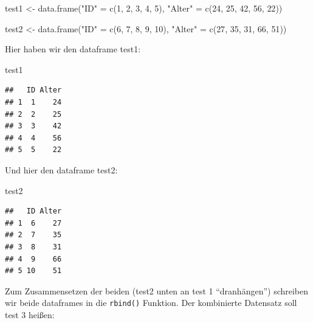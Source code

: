 \documentclass[
]{book}
\newenvironment{Shaded}{\begin{snugshade}}{\end{snugshade}}
\newcommand{\DecValTok}[1]{\textcolor[rgb]{0.00,0.00,0.81}{#1}}
\newcommand{\FunctionTok}[1]{\textcolor[rgb]{0.00,0.00,0.00}{#1}}
\newcommand{\NormalTok}[1]{#1}
\newcommand{\OtherTok}[1]{\textcolor[rgb]{0.56,0.35,0.01}{#1}}
\newcommand{\StringTok}[1]{\textcolor[rgb]{0.31,0.60,0.02}{#1}}
\begin{document}
\begin{Shaded}
\begin{Highlighting}[]
\NormalTok{test1 }\OtherTok{\textless{}{-}} \FunctionTok{data.frame}\NormalTok{(}\StringTok{"ID"} \OtherTok{=} \FunctionTok{c}\NormalTok{(}\DecValTok{1}\NormalTok{, }\DecValTok{2}\NormalTok{, }\DecValTok{3}\NormalTok{, }\DecValTok{4}\NormalTok{, }\DecValTok{5}\NormalTok{),}
                     \StringTok{"Alter"} \OtherTok{=} \FunctionTok{c}\NormalTok{(}\DecValTok{24}\NormalTok{, }\DecValTok{25}\NormalTok{, }\DecValTok{42}\NormalTok{, }\DecValTok{56}\NormalTok{, }\DecValTok{22}\NormalTok{))}

\NormalTok{test2 }\OtherTok{\textless{}{-}} \FunctionTok{data.frame}\NormalTok{(}\StringTok{"ID"} \OtherTok{=} \FunctionTok{c}\NormalTok{(}\DecValTok{6}\NormalTok{, }\DecValTok{7}\NormalTok{, }\DecValTok{8}\NormalTok{, }\DecValTok{9}\NormalTok{, }\DecValTok{10}\NormalTok{),}
                     \StringTok{"Alter"} \OtherTok{=} \FunctionTok{c}\NormalTok{(}\DecValTok{27}\NormalTok{, }\DecValTok{35}\NormalTok{, }\DecValTok{31}\NormalTok{, }\DecValTok{66}\NormalTok{, }\DecValTok{51}\NormalTok{))}
\end{Highlighting}
\end{Shaded}

Hier haben wir den dataframe test1:

\begin{Shaded}
\begin{Highlighting}[]
\NormalTok{test1}
\end{Highlighting}
\end{Shaded}

\begin{verbatim}
##   ID Alter
## 1  1    24
## 2  2    25
## 3  3    42
## 4  4    56
## 5  5    22
\end{verbatim}

Und hier den dataframe test2:

\begin{Shaded}
\begin{Highlighting}[]
\NormalTok{test2}
\end{Highlighting}
\end{Shaded}

\begin{verbatim}
##   ID Alter
## 1  6    27
## 2  7    35
## 3  8    31
## 4  9    66
## 5 10    51
\end{verbatim}

Zum Zusammensetzen der beiden (test2 unten an test 1 ``dranhängen'') schreiben wir beide dataframes in die \texttt{rbind()} Funktion. Der kombinierte Datensatz soll test 3 heißen:
\end{document}
